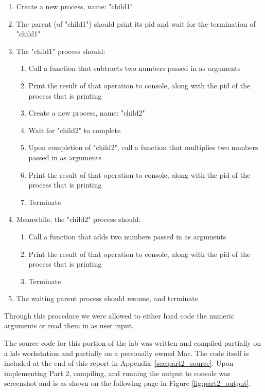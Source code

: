         \begin{enumerate}
            \itemsep0em
            \item Create a new process, name: "child1"
            \item The parent (of "child1") should print its pid and wait for the termination of "child1"
            \item The "child1" process should:
            \begin{enumerate}
                \itemsep0em
                \item Call a function that subtracts two numbers passed in as arguments
                \item Print the result of that operation to console, along with the pid of the process that is printing
                \item Create a new process, name: "child2"
                \item Wait for "child2" to complete
                \item Upon completion of "child2", call a function that multiplies two numbers passed in as arguments
                \item Print the result of that operation to console, along with the pid of the process that is printing
                \item Terminate
            \end{enumerate}
            \item Meanwhile, the "child2" process should:
            \begin{enumerate}
                \itemsep0em
                \item Call a function that adds two numbers passed in as arguments
                \item Print the result of that operation to console, along with the pid of the process that is printing
                \item Terminate
            \end{enumerate}
            \item The waiting parent process should resume, and terminate
        \end{enumerate}
        Through this procedure we were allowed to either hard code the numeric arguments or read them in as user input.

        \medskip
        \noindent The source code for this portion of the lab was written and compiled partially on a lab workstation and partially on a personally owned Mac.
        The code itself is included at the end of this report in Appendix~\ref{sec:part2_source}.
        Upon implementing Part 2, compiling, and running the output to console was screenshot and is as shown on the following page in Figure \ref{fig:part2_output}.

